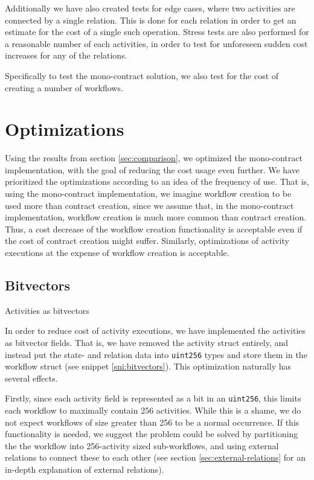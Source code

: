 \documentclass{article}
\begin{document}
	Additionally we have also created tests for edge cases, where two activities are connected by a single relation.
	This is done for each relation in order to get an estimate for the cost of a single such operation.
	Stress tests are also performed for a reasonable number of each activities, in order to test for unforeseen sudden cost increases for any of the relations.

	Specifically to test the mono-contract solution, we also test for the cost of creating a number of workflows.

	\section{Optimizations}
		Using the results from section \ref{sec:comparison}, we optimized the mono-contract implementation, with the goal of reducing the cost usage even further.
		We have prioritized the optimizations according to an idea of the frequency of use.
		That is, using the mono-contract implementation, we imagine workflow creation to be used more than contract creation, since we assume that, in the mono-contract implementation, workflow creation is much more common than contract creation. 
		Thus, a cost decrease of the workflow creation functionality is acceptable even if the cost of contract creation might suffer. 
		Similarly, optimizations of activity executions at the expense of workflow creation is acceptable.

		\subsection{Bitvectors}

		\begin{snippet}[ht!]
			\centering
			
		 	\caption[Activities as bitvectors]
		 	{Activities as bitvectors}
		 	\label{sni:bitvectors}
		\end{snippet}

		In order to reduce cost of activity executions, we have implemented the activities as bitvector fields. 
		That is, we have removed the activity struct entirely, and instead put the state- and relation data into \texttt{uint256} types and store them in the workflow struct (see snippet \ref{sni:bitvectors}).
		This optimization naturally has several effects.

		Firstly, since each activity field is represented as a bit in an \texttt{uint256}, this limits each workflow to maximally contain 256 activities. 
		While this is a shame, we do not expect workflows of size greater than 256 to be a normal occurrence.
		If this functionality is needed, we suggest the problem could be solved by partitioning the the workflow into 256-activity sized sub-workflows, and using external relations to connect these to each other (see section \ref{sec:external-relations} for an in-depth explanation of external relations).
\end{document}
